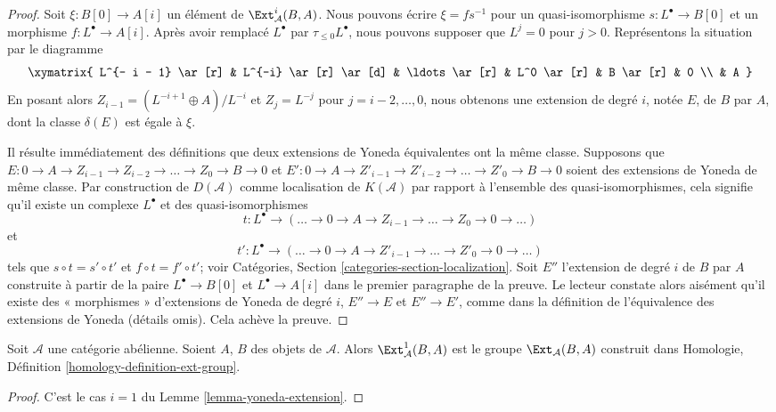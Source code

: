 \begin{proof}
Soit $\xi : B[0] \to A[i]$ un élément de $\Ext^i_\mathcal{A}(B, A)$.
Nous pouvons écrire $\xi = f s^{-1}$ pour un quasi-isomorphisme
$s : L^\bullet \to B[0]$ et un morphisme $f : L^\bullet \to A[i]$.
Après avoir remplacé $L^\bullet$ par $\tau_{\leq 0}L^\bullet$, nous pouvons
supposer que $L^j = 0$ pour $j > 0$. Représentons la situation par le diagramme
$$
\xymatrix{
L^{- i - 1} \ar[r] & L^{-i} \ar[r] \ar[d] & \ldots \ar[r] &
L^0 \ar[r] & B \ar[r] & 0 \\
& A
}
$$
En posant alors $Z_{i - 1} = (L^{- i + 1} \oplus A)/L^{-i}$ et
$Z_j = L^{-j}$ pour $j = i - 2, \ldots, 0$, nous obtenons une extension de
degré $i$, notée $E$, de $B$ par $A$, dont la classe $\delta(E)$ est égale à
$\xi$.

\medskip\noindent
Il résulte immédiatement des définitions que deux extensions de Yoneda
équivalentes ont la même classe. Supposons que
$E : 0 \to A \to Z_{i - 1} \to Z_{i - 2} \to \ldots \to Z_0 \to B \to 0$ et
$E' : 0 \to A \to Z'_{i - 1} \to Z'_{i - 2} \to \ldots \to Z'_0 \to B \to 0$
soient des extensions de Yoneda de même classe.
Par construction de $D(\mathcal{A})$ comme localisation de
$K(\mathcal{A})$ par rapport à l'ensemble des quasi-isomorphismes, cela
signifie qu'il existe un complexe $L^\bullet$ et des quasi-isomorphismes
$$
t : L^\bullet \to
(\ldots \to 0 \to A \to Z_{i - 1} \to \ldots \to Z_0 \to 0 \to \ldots)
$$
et
$$
t' : L^\bullet \to
(\ldots \to 0 \to A \to Z'_{i - 1} \to \ldots \to Z'_0 \to 0 \to \ldots)
$$
tels que $s \circ t = s' \circ t'$ et $f \circ t = f' \circ t'$; voir
Catégories, Section \ref{categories-section-localization}.
Soit $E''$ l'extension de degré $i$ de $B$ par $A$ construite à partir de
la paire $L^\bullet \to B[0]$ et $L^\bullet \to A[i]$ dans le premier
paragraphe de la preuve. Le lecteur constate alors aisément qu'il existe
des « morphismes » d'extensions de Yoneda de degré $i$, $E'' \to E$ et
$E'' \to E'$, comme dans la définition de l'équivalence des extensions
de Yoneda (détails omis). Cela achève la preuve.
\end{proof}

\begin{lemma}
\label{lemma-ext-1}
Soit $\mathcal{A}$ une catégorie abélienne. Soient $A$, $B$ des objets
de $\mathcal{A}$. Alors $\Ext^1_\mathcal{A}(B, A)$ est le groupe
$\Ext_\mathcal{A}(B, A)$ construit dans
Homologie, Définition \ref{homology-definition-ext-group}.
\end{lemma}

\begin{proof}
C'est le cas $i = 1$ du
Lemme \ref{lemma-yoneda-extension}.
\end{proof}

